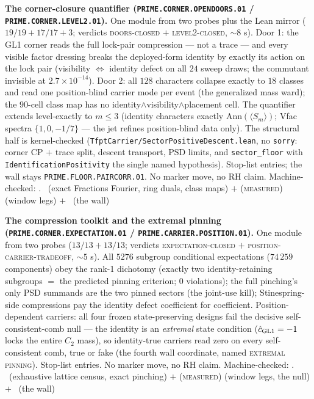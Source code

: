 \par\smallskip\noindent\textbf{The corner-closure quantifier
(\texttt{PRIME.CORNER.OPENDOORS.01} /
\texttt{PRIME.CORNER.LEVEL2.01}).}
One module from two probes plus the Lean mirror
($19/19 + 17/17 + 3$; verdicts \textsc{doors-closed} $+$
\textsc{level2-closed}, $\sim8$ s).  Door 1: the GL1 corner reads
the full lock-pair compression --- not a trace --- and every
visible factor dressing breaks the deployed-form identity by
exactly its action on the lock pair (visibility $\Leftrightarrow$
identity defect on all $24$ sweep draws; the commutant invisible
at $2.7\times10^{-14}$).  Door 2: all $128$ characters collapse
exactly to $18$ classes and read one position-blind carrier mode
per event (the generalized mass ward); the $90$-cell class map has
no identity$\wedge$visibility$\wedge$placement cell.  The
quantifier extends level-exactly to $m \le 3$ (identity characters
exactly $\mathrm{Ann}(\langle S_m\rangle)$; Vfac spectra
$\{1, 0, -1/7\}$ --- the jet refines position-blind data only).
The structural half is kernel-checked
(\texttt{TfptCarrier/SectorPositiveDescent.lean}, no
\texttt{sorry}: corner CP $+$ trace split, descent transport, PSD
limits, and \texttt{sector\_floor} with
\texttt{IdentificationPositivity} the single named hypothesis).
Stop-list entries; the wall stays
\texttt{PRIME.FLOOR.PAIRCORR.01}.  No marker move, no RH claim.
Machine-checked: .
\mE\ (exact Fractions Fourier, ring duals, class maps) $+$
(\textsc{measured}) (window legs) $+$ \mO\ (the wall)
\par\smallskip


\par\smallskip\noindent\textbf{The compression toolkit and the
extremal pinning (\texttt{PRIME.CORNER.EXPECTATION.01} /
\texttt{PRIME.CARRIER.POSITION.01}).}
One module from two probes ($13/13 + 13/13$; verdicts
\textsc{expectation-closed} $+$
\textsc{position-carrier-tradeoff}, $\sim5$ s).  All $5276$
subgroup conditional expectations ($74\,259$ components) obey the
rank-1 dichotomy (exactly two identity-retaining subgroups $=$
the predicted pinning criterion; $0$ violations); the full
pinching's only PSD summands are the two pinned sectors (the
joint-use kill); Stinespring-side compressions pay the identity
defect coefficient for coefficient.  Position-dependent carriers:
all four frozen state-preserving designs fail the decisive
self-consistent-comb null --- the identity is an \emph{extremal}
state condition ($\hat c_{\rm GL1} = -1$ locks the entire $C_2$
mass), so identity-true carriers read zero on every
self-consistent comb, true or fake (the fourth wall coordinate,
named \textsc{extremal pinning}).  Stop-list entries.  No marker
move, no RH claim.
Machine-checked: .
\mE\ (exhaustive lattice census, exact pinching) $+$
(\textsc{measured}) (window legs, the null) $+$ \mO\ (the wall)
\par\smallskip


